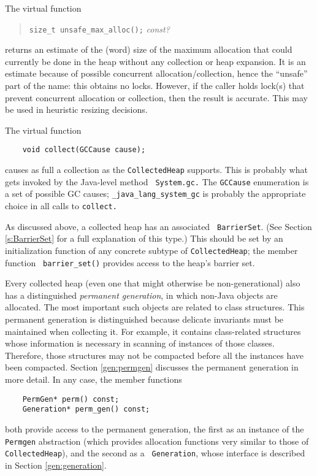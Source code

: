 \documentclass{article}
\begin{document}

The virtual function
\begin{quote}
    {\tt size\_t unsafe\_max\_alloc();} {\em const?}
\end{quote}
returns an estimate of the (word) size of the maximum allocation that
could currently be done in the heap without any collection or heap
expansion.  It is an estimate because of possible concurrent
allocation/collection, hence the ``unsafe'' part of the name: this
obtains no locks.  However, if the caller holds lock(s) that prevent
concurrent allocation or collection, then the result is accurate.
This may be used in heuristic resizing decisions.

The virtual function
\begin{verbatim}
    void collect(GCCause cause);
\end{verbatim}
causes as full a collection as the {\tt CollectedHeap} supports.  This
is probably what gets invoked by the Java-level method {\tt
System.gc.}  The {\tt GCCause} enumeration is a set of possible GC
causes; {\tt \_java\_lang\_system\_gc} is probably the appropriate choice
in all calls to {\tt collect.}

As discussed above, a collected heap has an associated {\tt
BarrierSet}.  (See Section \ref{s:BarrierSet} for a full explanation of
this type.)  This should be set by an initialization function of any
concrete subtype of {\tt CollectedHeap}; the member function {\tt
barrier\_set()} provides access to the heap's barrier set.

Every collected heap (even one that might otherwise be non-generational)
also has a distinguished {\em permanent generation}, in which non-Java
objects are allocated.  The most important such objects are related to
class structures.  This permanent generation is distinguished because
delicate invariants must be maintained when collecting it.  For
example, it contains class-related structures whose information is
necessary in scanning of instances of those classes.  Therefore, those
structures may not be compacted before all the instances have been
compacted.  Section \ref{gen:permgen} discusses the permanent
generation in more detail.  In any case, the member functions
\begin{verbatim}
    PermGen* perm() const;
    Generation* perm_gen() const;
\end{verbatim}
both provide access to the permanent generation, the first as an instance
of the {\tt Permgen} abstraction (which provides allocation functions
very similar to those of {\tt CollectedHeap}), and the second as a {\tt
Generation}, whose interface is described in Section
\ref{gen:generation}.
\end{document}
